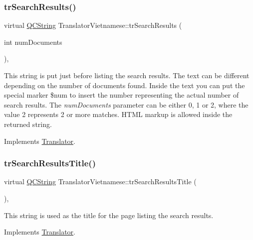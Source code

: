 \subsubsection{\texorpdfstring{trSearchResults()}{trSearchResults()}}
{\footnotesize\ttfamily virtual \mbox{\hyperlink{class_q_c_string}{Q\+C\+String}} Translator\+Vietnamese\+::tr\+Search\+Results (\begin{DoxyParamCaption}\item[{int}]{num\+Documents }\end{DoxyParamCaption})\hspace{0.3cm}{\ttfamily [inline]}, {\ttfamily [virtual]}}

This string is put just before listing the search results. The text can be different depending on the number of documents found. Inside the text you can put the special marker \$num to insert the number representing the actual number of search results. The {\itshape num\+Documents} parameter can be either 0, 1 or 2, where the value 2 represents 2 or more matches. H\+T\+ML markup is allowed inside the returned string. 

Implements \mbox{\hyperlink{class_translator}{Translator}}.

\mbox{\label{class_translator_vietnamese_af10f48afc231f87ca74a70c22cb80ee0}} 
\subsubsection{\texorpdfstring{trSearchResultsTitle()}{trSearchResultsTitle()}}
{\footnotesize\ttfamily virtual \mbox{\hyperlink{class_q_c_string}{Q\+C\+String}} Translator\+Vietnamese\+::tr\+Search\+Results\+Title (\begin{DoxyParamCaption}{ }\end{DoxyParamCaption})\hspace{0.3cm}{\ttfamily [inline]}, {\ttfamily [virtual]}}

This string is used as the title for the page listing the search results. 

Implements \mbox{\hyperlink{class_translator}{Translator}}.

\mbox{\label{class_translator_vietnamese_a9d11e0e4b381412d213609cd321a9275}} 
